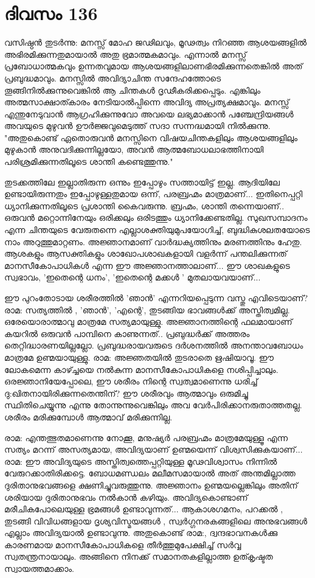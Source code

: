  
\section{ദിവസം 136}


വസിഷ്ഠന്‍ തുടര്‍ന്നു: മനസ്സ്‌ മോഹ ജഢിലവും, മൂഢത്വം നിറഞ്ഞ ആശയങ്ങളില്‍ അഭിരമിക്കുന്നതുമായാല്‍ അതു ഭ്രമാത്മകമാവും. എന്നാല്‍ മനസ്സ്‌ പ്രബോധാത്മകവും ഉന്നതവുമായ ആശയങ്ങളിലാണഭിരമിക്കുന്നതെങ്കില്‍ അത്‌ പ്രബുദ്ധമാവും. മനസ്സില്‍ അവിദ്യാചിന്ത സന്ദേഹത്തോടെ തൂങ്ങിനില്‍ക്കുന്നുവെങ്കില്‍ ആ ചിന്തകള്‍ ദൃഢീകരിക്കപ്പെടും. എങ്കിലും അത്മസാക്ഷാത്കാരം നേടിയാല്‍പ്പിന്നെ അവിദ്യ അപ്രത്യക്ഷമാവും. മനസ്സ്‌ എന്തുനേടുവാന്‍ ആഗ്രഹിക്കുന്നുവോ അവയെ ലഭ്യമാക്കാന്‍ പഞ്ചേന്ദ്രിയങ്ങള്‍ അവയുടെ മുഴുവന്‍ ഊര്‍ജ്ജവുമെടുത്ത്‌ സദാ സന്നദ്ധമായി നില്‍ക്കുന്നു. "അതുകൊണ്ട്‌ ഏതൊരുവന്‍ മനസ്സിനെ വിഷയചിന്തകളിലും ആശയങ്ങളിലും മുഴുകാന്‍ അനുവദിക്കുന്നില്ലയോ, അവന്‍ ആത്മബോധലാഭത്തിനായി പരിശ്രമിക്കുന്നതിലൂടെ ശാന്തി കണ്ടെത്തുന്നു."

തുടക്കത്തിലേ ഇല്ലാതിരുന്ന ഒന്നും ഇപ്പോഴും സത്തായിട്ട്‌ ഇല്ല. ആദിയിലേ ഉണ്ടായിരുന്നതും ഇപ്പോഴുള്ളതുമായ ഒന്ന്, പരബ്രഹ്മം മാത്രമാണ്‌...  ഇതിനെപ്പറ്റി ധ്യാനിക്കുന്നതിലൂടെ പ്രശാന്തി കൈവരുന്നു. ബ്രഹ്മം, ശാന്തി തന്നെയാണ്‌.. ഒരുവന്‍ മറ്റൊന്നിനേയും ഒരിക്കലും ഒരിടത്തും ധ്യാനിക്കേണ്ടതില്ല. സുഖസമ്പാദനം എന്ന ചിന്തയുടെ വേരുതന്നെ എല്ലാശക്തിയുമുപയോഗിച്ച്‌, ബുദ്ധികുശലതയോടെ നാം അറുത്തുമാറ്റണം. അജ്ഞാനമാണ്‌ വാര്‍ദ്ധക്യത്തിനും മരണത്തിനും ഹേതു. ആശകളും ആസക്തികളും ശാഖോപശാഖകളായി വളര്‍ന്ന് പന്തലിക്കുന്നത്‌ മാനസീകോപാധികള്‍ എന്ന ഈ അജ്ഞാനത്താലാണ്‌...  ഈ ശാഖകളുടെ സ്വഭാവം, 'ഇതെന്റെ ധനം', 'ഇതെന്റെ മക്കള്‍ ' മുതലായവയാണ്‌...

ഈ പുറംതോടായ ശരീരത്തില്‍ 'ഞാന്‍' എന്നറിയപ്പെടുന്ന വസ്തു എവിടെയാണ്‌? രാമ: സത്യത്തില്‍ , 'ഞാന്‍', 'എന്റെ', തുടങ്ങിയ ഭാവങ്ങള്‍ക്ക്‌ അസ്തിത്വമില്ല. ഒരേയൊരാത്മാവു മാത്രമേ സത്യമായുള്ളു. അജ്ഞാനത്തിന്റെ ഫലമായാണ്‌ കയറില്‍ ഒരുവന്‍ പാമ്പിനെ കാണുന്നത്‌..  പ്രബുദ്ധര്‍ക്ക്‌ അത്തരം തെറ്റിദ്ധാരണയില്ലല്ലോ. പ്രബുദ്ധരായവരുടെ ദര്‍ശനത്തില്‍ അനന്താവബോധം മാത്രമേ ഉണ്മയായുള്ളു. രാമ: അജ്ഞതയില്‍ തുടരാതെ ഋഷിയാവൂ. ഈ ലോകമെന്ന കാഴ്ച്ചയെ നല്‍കുന്ന മാനസീകോപാധികളെ നശിപ്പിച്ചാലും. ഒരജ്ഞാനിയേപ്പോലെ, ഈ ശരീരം നിന്റെ സ്വത്വമാണെന്നു ധരിച്ച്‌ ദു:ഖിതനായിരിക്കുന്നതെന്തിന്‌? ഈ ശരീരവും ആത്മാവും ഒരുമിച്ചു സ്ഥിതിചെയ്യുന്നു എന്നു തോന്നുന്നുവെങ്കിലും അവ വേര്‍പിരിക്കാനരുതാത്തതല്ല. ശരീരം മരിക്കുമ്പോള്‍ ആത്മാവ്‌ മരിക്കുന്നില്ല.

രാമ: എന്തത്ഭുതമാണെന്നു നോക്കൂ, മനുഷ്യര്‍ പരബ്രഹ്മം മാത്രമേയുള്ളൂ എന്ന സത്യം മറന്ന് അസത്യമായ, അവിദ്യയാണ്‌ ഉണ്മയെന്ന് വിശ്വസിക്കുകയാണ്‌...  രാമ: ഈ അവിദ്യയുടെ അസ്തിത്വത്തെപ്പറ്റിയുള്ള മൂഢവിശ്വാസം നിന്നില്‍ വേരുറക്കാതിരിക്കട്ടെ. ബോധമണ്ഡലം മലീമസമായാല്‍ അത്‌ അന്തമില്ലാത്ത ദുരിതാനുഭവങ്ങളെ ക്ഷണിച്ചുവരുത്തുന്നു. അജ്ഞാനം ഉണ്മയല്ലെങ്കിലും അതിന്‌ ശരിയായ ദുരിതാനുഭവം നല്‍കാന്‍ കഴിയും. അവിദ്യകൊണ്ടാണ്‌ മരീചികപോലെയുള്ള ഭ്രമങ്ങള്‍ ഉണ്ടാവുന്നത്‌...  ആകാശഗമനം, പറക്കല്‍ , തുടങ്ങി വിവിധങ്ങളായ ദൃശ്യവിസ്മയങ്ങള്‍ , സ്വര്‍ഗ്ഗനരകങ്ങളിലെ അനുഭവങ്ങള്‍ എല്ലാം അവിദ്യയാല്‍ ഉണ്ടാവുന്നു. അതുകൊണ്ട്‌ രാമ:, ദ്വന്ദഭാവനകള്‍ക്കു കാരണമായ മാനസീകോപാധികളെ തീര്‍ത്തുമുപേക്ഷിച്ച്‌ സര്‍വ്വ സ്വതന്ത്രനായാലും. അങ്ങിനെ നിനക്ക്‌ സമാനതകളില്ലാത്ത ഉത്കൃഷ്ടത സ്വായത്തമാക്കാം. 

